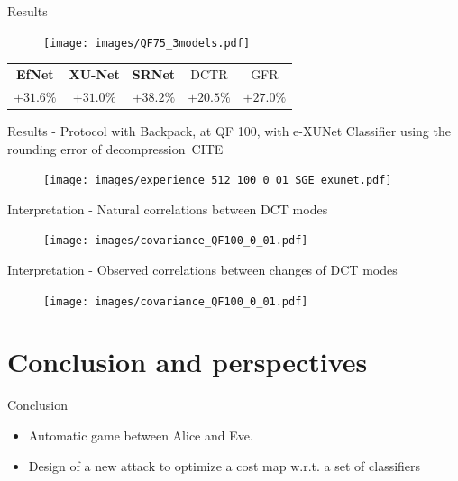 \documentclass[10pt]{beamer}
\begin{document}
\begin{frame}{Results}

    \begin{figure}[h]
        \texttt{[image: images/QF75\_3models.pdf]}
    \end{figure}
    \pause
    \begin{center}
        \begin{tabular}{ccccc}
           \textbf{EfNet} & \textbf{XU-Net} & \textbf{SRNet} & DCTR & GFR \\
           \alert{$+31.6 \%$} & \alert{$+31.0\%$} & \alert{$+38.2 \%$} & $+20.5\%$ & $+27.0 \%$
        \end{tabular}
    \end{center}
    
\end{frame}


\begin{frame}{Results - Protocol with Backpack, at QF 100, with e-XUNet}
Classifier using the rounding error of decompression~CITE
    \begin{figure}[h]
        \texttt{[image: images/experience\_512\_100\_0\_01\_SGE\_exunet.pdf]}
    \end{figure}
\end{frame}


\begin{frame}{Interpretation - Natural correlations between DCT modes}
    \begin{figure}[h]
        \texttt{[image: images/covariance\_QF100\_0\_01.pdf]}
    \end{figure}
\end{frame}


\begin{frame}{Interpretation - Observed correlations between changes of DCT modes}
    \begin{figure}[h]
        \texttt{[image: images/covariance\_QF100\_0\_01.pdf]}
    \end{figure}
\end{frame}


\section{Conclusion and perspectives}


\begin{frame}{Conclusion}
    \begin{itemize}
        \item Automatic game between Alice and Eve. 
        \pause
        \item Design of a new attack to optimize a cost map w.r.t. a set of classifiers

    \end{itemize}

\end{frame}
\end{document}
